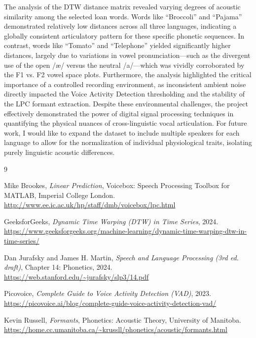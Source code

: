 \documentclass[11pt, letterpaper]{article}
\begin{document}
The analysis of the DTW distance matrix revealed varying degrees of acoustic similarity among the selected loan words. Words like ``Broccoli'' and ``Pajama'' demonstrated relatively low distances across all three languages, indicating a globally consistent articulatory pattern for these specific phonetic sequences. In contrast, words like ``Tomato'' and ``Telephone'' yielded significantly higher distances, largely due to variations in vowel pronunciation—such as the divergent use of the open /æ/ versus the neutral /a/—which was vividly corroborated by the F1 vs. F2 vowel space plots. Furthermore, the analysis highlighted the critical importance of a controlled recording environment, as inconsistent ambient noise directly impacted the Voice Activity Detection thresholding and the stability of the LPC formant extraction. Despite these environmental challenges, the project effectively demonstrated the power of digital signal processing techniques in quantifying the physical nuances of cross-linguistic vocal articulation.
For future work, I would like to expand the dataset to include multiple speakers for each language to allow for the normalization of individual physiological traits, isolating purely linguistic acoustic differences.

\begin{thebibliography}{9}

Mike Brookes, \textit{Linear Prediction}, Voicebox: Speech Processing Toolbox for MATLAB, Imperial College London. \url{http://www.ee.ic.ac.uk/hp/staff/dmb/voicebox/lpc.html}

GeeksforGeeks, \textit{Dynamic Time Warping (DTW) in Time Series}, 2024. \url{https://www.geeksforgeeks.org/machine-learning/dynamic-time-warping-dtw-in-time-series/}

Dan Jurafsky and James H. Martin, \textit{Speech and Language Processing (3rd ed. draft)}, Chapter 14: Phonetics, 2024. \url{https://web.stanford.edu/~jurafsky/slp3/14.pdf}

Picovoice, \textit{Complete Guide to Voice Activity Detection (VAD)}, 2023. \url{https://picovoice.ai/blog/complete-guide-voice-activity-detection-vad/}

Kevin Russell, \textit{Formants}, Phonetics: Acoustic Theory, University of Manitoba. \url{https://home.cc.umanitoba.ca/~krussll/phonetics/acoustic/formants.html}

\end{thebibliography}
\end{document}

